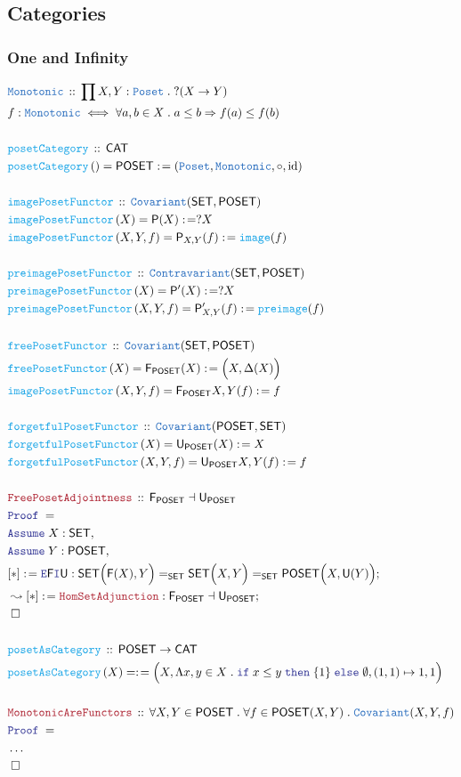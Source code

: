 \documentclass[12pt]{scrartcl}
\newcommand{\TYPE}[1]{\textcolor{NavyBlue}{\mathtt{#1}}}
\newcommand{\FUNC}[1]{\textcolor{Cerulean}{\mathtt{#1}}}
\newcommand{\LOGIC}[1]{\textcolor{Blue}{\mathtt{#1}}}
\newcommand{\THM}[1]{\textcolor{Maroon}{\mathtt{#1}}}
\renewcommand{\.}{\; . \;}
\newcommand{\de}{: \kern 0.1pc =}
\newcommand{\If}{\LOGIC{if} \;}
\newcommand{\Then}{ \; \LOGIC{then} \;}
\newcommand{\Else}{\; \LOGIC{else} \;}
\newcommand{\Act}[1]{\left( #1 \right)}
\newcommand{\Theorem}[2]{& \THM{#1} \, :: \, #2 \\ & \Proof = \\ }
\newcommand{\DeclareType}[2]{& \TYPE{#1} \, :: \, #2 \\}
\newcommand{\DefineType}[3]{& #1 : \TYPE{#2} \iff #3 \\}
\newcommand{\DeclareFunc}[2]{& \FUNC{#1} \, :: \, #2 \\}
\newcommand{\DefineNamedFunc}[4]{&  \FUNC{#1}\Act{#2} = #3 \de #4 \\}
\newcommand{\Page}[1]{ \begin{align*} #1 \end{align*}   }
\newcommand{\NoProof}{ & \ldots \\ \EndProof}
\newcommand{\Imply}{\Rightarrow}
\newcommand{\Intro}{\LOGIC{I}}
\newcommand{\Elim}{\LOGIC{E}}
\DeclareMathOperator*{\id}{id}
\newcommand{\Conclude}[3]{& #1 \de #2 : #3; \\}
\newcommand{\DeriveConclude}[3]{& \leadsto #1 \de #2 : #3 ; \\}
\newcommand{\Assume}[2]{& \LOGIC{Assume} \; #1 : #2, \\}
\newcommand{\QED}{\; \square}
\newcommand{\EndProof}{& \QED \\}
\newcommand{\Proof}{\LOGIC{Proof} \; }
\newcommand{\Cov}{\TYPE{Covariant}}
\newcommand{\Contra}{\TYPE{Contravariant}}
\newcommand{\CAT}{\mathsf{CAT}}
\newcommand{\SET}{\mathsf{SET}}
\newcommand{\Poset}{\TYPE{Poset}}
\newcommand{\POSET}{\mathsf{POSET}}
\renewcommand{\P}{\mathsf{P}}
\newcommand{\F}{\mathsf{F}}
\newcommand{\U}{\mathsf{U}}
\begin{document}
\subsection{Categories}
\subsubsection{One and Infinity}
\Page{
	\DeclareType{Monotonic}{\prod X,Y : \Poset \. ?(X \to Y)}
	\DefineType{f}{Monotonic}{\forall a,b \in X \. a \le b \Imply f(a) \le f(b)}
	\\
	\DeclareFunc{posetCategory}{\CAT}
	\DefineNamedFunc{posetCategory}{}{\POSET}
	{
		( \TYPE{Poset}, \TYPE{Monotonic}, \circ, \id )
	}
	\\
	\DeclareFunc{imagePosetFunctor}{\Cov(\SET,\POSET)}
	\DefineNamedFunc{imagePosetFunctor}{X}{\P(X)}{?X}
	\DefineNamedFunc{imagePosetFunctor}{X,Y,f}{\P_{X,Y}(f)}{\FUNC{image}(f)}
	\\
	\DeclareFunc{preimagePosetFunctor}{\Contra(\SET,\POSET)}
	\DefineNamedFunc{preimagePosetFunctor}{X}{\P'(X)}{?X}
	\DefineNamedFunc{preimagePosetFunctor}{X,Y,f}{\P'_{X,Y}(f)}{\FUNC{preimage}(f)}
	\\
	\DeclareFunc{freePosetFunctor}{\Cov(\SET,\POSET)}
	\DefineNamedFunc{freePosetFunctor}{X}{\F_\POSET(X)}{\Big(X,\Delta(X)\Big)}
	\DefineNamedFunc{imagePosetFunctor}{X,Y,f}{\F_\POSET{X,Y}(f)}{f}
	\\
	\DeclareFunc{forgetfulPosetFunctor}{\Cov(\POSET,\SET)}
	\DefineNamedFunc{forgetfulPosetFunctor}{X}{\U_\POSET(X)}{X}
	\DefineNamedFunc{forgetfulPosetFunctor}{X,Y,f}{\U_\POSET{X,Y}(f)}{f}
	\\
	\Theorem{FreePosetAdjointness}
	{
		\F_\POSET \dashv \U_\POSET
	}
	\Assume{X}{\SET}
	\Assume{Y}{\POSET}
	\Conclude{[*]}{ \Elim \F \Intro \U  }
	{
		\SET\Big(\F(X), Y\Big) =_{\SET}
		\SET\Big( X, Y  \Big) =_{\SET}
		\POSET\Big( X, \U(Y) \Big)
	}
	\DeriveConclude{[*]}{\THM{HomSetAdjunction}}
	{
		\F_\POSET \dashv \U_\POSET
	}
	\EndProof
	\\
	\DeclareFunc{posetAsCategory}
	{   
		\POSET \to \CAT
	}
	\DefineNamedFunc{posetAsCategory}{X}{}
	{
		\Big( X, \Lambda x,y \in X \. \If x \le y \Then \{1\} \Else \emptyset   , (1,1) \mapsto 1 ,1\Big)
	}
	\\
	\Theorem{MonotonicAreFunctors}{\forall X,Y \in \POSET \. \forall f \in \POSET(X,Y) \. \Cov(X,Y,f)}
	\NoProof
}
\end{document}

